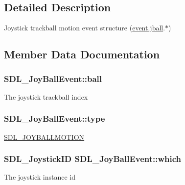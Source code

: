 \subsection{Detailed Description}
Joystick trackball motion event structure (\hyperlink{union_s_d_l___event_ae433f511e3383d17f8fe02df745ee8f8}{event.\+jball}.$\ast$) 

\subsection{Member Data Documentation}
\hypertarget{struct_s_d_l___joy_ball_event_add4eb0daeaf95ae56e8c7cfcec560242}{}
\subsubsection[{ball}]{ S\+D\+L\+\_\+\+Joy\+Ball\+Event\+::ball}\label{struct_s_d_l___joy_ball_event_add4eb0daeaf95ae56e8c7cfcec560242}
The joystick trackball index \hypertarget{struct_s_d_l___joy_ball_event_a0b192b95a043cb494b27ed9b27e84db1}{}
\subsubsection[{type}]{ S\+D\+L\+\_\+\+Joy\+Ball\+Event\+::type}\label{struct_s_d_l___joy_ball_event_a0b192b95a043cb494b27ed9b27e84db1}
\hyperlink{_s_d_l__events_8h_a3b589e89be6b35c02e0dd34a55f3fccaa78f859489cfd565c305c7f6f9d5b25c1}{S\+D\+L\+\_\+\+J\+O\+Y\+B\+A\+L\+L\+M\+O\+T\+I\+O\+N} \hypertarget{struct_s_d_l___joy_ball_event_a4e2e185717d529167cd0bea21093c454}{}
\subsubsection[{which}]{\setlength{\rightskip}{0pt plus 5cm}S\+D\+L\+\_\+\+Joystick\+I\+D S\+D\+L\+\_\+\+Joy\+Ball\+Event\+::which}\label{struct_s_d_l___joy_ball_event_a4e2e185717d529167cd0bea21093c454}
The joystick instance id \hypertarget{struct_s_d_l___joy_ball_event_a959a8473aa1964e5e1778c27a9ffd261}{}
